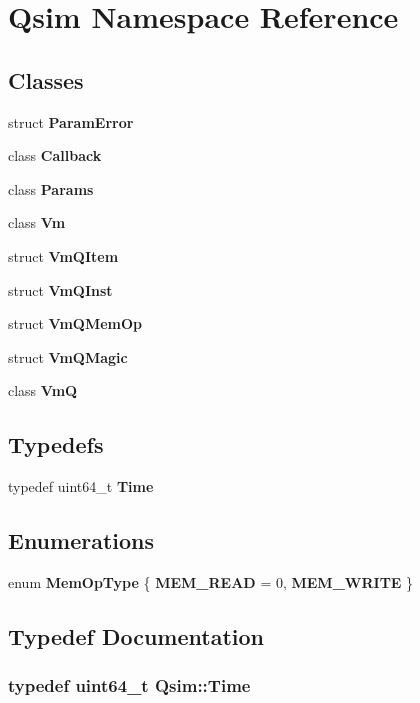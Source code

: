 \section{Qsim Namespace Reference}
\label{namespaceQsim}
\subsection*{Classes}
\begin{CompactItemize}
\item 
struct {\bf ParamError}
\item 
class {\bf Callback}
\item 
class {\bf Params}
\item 
class {\bf Vm}
\item 
struct {\bf VmQItem}
\item 
struct {\bf VmQInst}
\item 
struct {\bf VmQMemOp}
\item 
struct {\bf VmQMagic}
\item 
class {\bf VmQ}
\end{CompactItemize}
\subsection*{Typedefs}
\begin{CompactItemize}
\item 
typedef uint64\_\-t {\bf Time}
\end{CompactItemize}
\subsection*{Enumerations}
\begin{CompactItemize}
\item 
enum {\bf MemOpType} \{ {\bf MEM\_\-READ} =  0, 
{\bf MEM\_\-WRITE}
 \}
\end{CompactItemize}


\subsection{Typedef Documentation}
\subsubsection[{Time}]{\setlength{\rightskip}{0pt plus 5cm}typedef uint64\_\-t {\bf Qsim::Time}}\label{namespaceQsim_6389456cc3055cb9573c339cdc7e8910}




